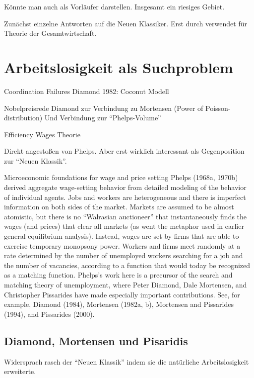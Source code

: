 Könnte man auch als Vorläufer darstellen. Insgesamt ein riesiges Gebiet.

Zunächst einzelne Antworten auf die Neuen Klassiker. Erst durch \textcite{RomerDavid1990} verwendet für Theorie der Gesamtwirtschaft.



\section{Arbeitslosigkeit als Suchproblem}
\label{Suchtheorie}


Coordination Failures
Diamond 1982: Coconut Modell

Nobelpreisrede Diamond zur Verbindung zu Mortensen (Power of Poisson-distribution)
Und Verbindung zur "`Phelps-Volume"'


Efficiency Wages Theorie


Direkt angestoßen von Phelps. Aber erst wirklich interessant als Gegenposition zur "`Neuen Klassik"'.
\textcite[S. 683]{Phelps1968}

Microeconomic foundations for wage and price setting
Phelps (1968a, 1970b) derived aggregate wage-setting behavior from detailed modeling of the 
behavior of individual agents. Jobs and workers are heterogeneous and there is imperfect 
information on both sides of the market. Markets are assumed to be almost atomistic, but there is 
no “Walrasian auctioneer” that instantaneously finds the wages (and prices) that clear all markets 
(as went the metaphor used in earlier general equilibrium analysis). Instead, wages are set by 
firms that are able to exercise temporary monopsony power. Workers and firms meet randomly 
at a rate determined by the number of unemployed workers searching for a job and the number of 
vacancies, according to a function that would today be recognized as a matching function. 
Phelps’s work here is a precursor of the search and matching theory of unemployment, where 
Peter Diamond, Dale Mortensen, and Christopher Pissarides have made especially important 
contributions. \parencite{Nobelpreis-Komitee2006}  See, for example, Diamond (1984), Mortensen (1982a, b), Mortensen and Pissarides (1994), and Pissarides 
(2000).


\subsection{Diamond, Mortensen und Pisaridis}

Widersprach rasch der "`Neuen Klassik"' indem sie die natürliche Arbeitslosigkeit erweiterte.




